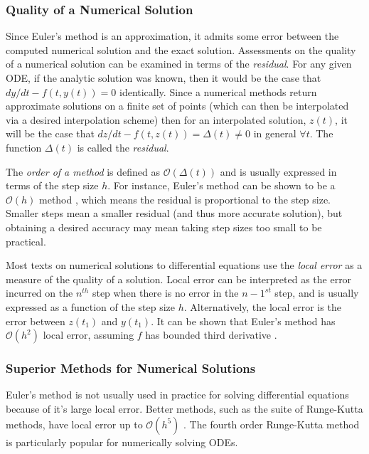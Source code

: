 \subsubsection{Quality of a Numerical Solution}

Since Euler's method is an approximation, it admits some error between the computed numerical solution and the exact solution.  Assessments on the quality of a numerical solution can be examined in terms of the \textit{residual}.  For any given ODE, if the analytic solution was known, then it would be the case that $ dy/dt - f(t,y(t))= 0 $ identically.  Since a numerical methods return approximate solutions on a finite set of points (which can then be interpolated via a desired interpolation scheme) then for an interpolated solution, $ z(t) $, it will be the case that $ dz/dt - f(t,z(t)) = \Delta (t) \neq 0$ in general $ \forall t $.  The function $ \Delta (t) $ is called the \textit{residual}.

The \textit{order of a method} is defined as $ \mathcal{O}(\Delta (t)) $ and is usually expressed in terms of the step size $ h $.  For instance, Euler's method can be shown to be a $ \mathcal{O}(h) $ method \cite{corless2013graduate}, which means the residual is proportional to the step size.  Smaller steps mean a smaller residual (and thus more accurate solution), but obtaining a desired accuracy may mean taking step sizes too small to be practical.

Most texts on numerical solutions to differential equations use the \textit{local error} as a measure of the quality of a solution.  Local error can be interpreted as the error incurred on the $ n^{th} $ step when there is no error in the $ n-1^{st} $ step, and is usually expressed as a function of the step size $ h $.  Alternatively, the local error is the error between $ z(t_1) $ and $ y(t_1) $. It can be shown that Euler's method has $ \mathcal{O}(h^2) $ local error, assuming $ f $ has bounded third derivative \cite{corless2013graduate}.

\subsubsection{Superior Methods for Numerical Solutions}

Euler's method is not usually used in practice for solving differential equations because of it's large local error.  Better methods, such as the suite of Runge-Kutta methods,  have local error up to  $ \mathcal{O}(h^5) $ \cite{boyce2012differential}.  The fourth order Runge-Kutta method is particularly popular for numerically solving ODEs.

